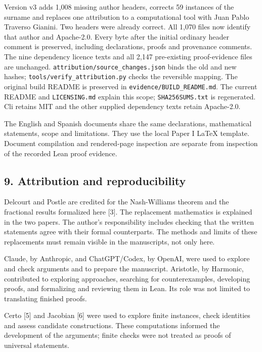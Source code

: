 \documentclass[english,11pt,a4paper]{article}
\begin{document}
Version v3 adds 1,008 missing author headers, corrects 59 instances of the surname and replaces one attribution to a computational tool with Juan Pablo Traverso Gianini. Two headers were already correct. All 1,070 files now identify that author and Apache-2.0. Every byte after the initial ordinary header comment is preserved, including declarations, proofs and provenance comments. The nine dependency licence texts and all 2,147 pre-existing proof-evidence files are unchanged. \texttt{attribution/\allowbreak{}source\_\allowbreak{}changes.\allowbreak{}json} binds the old and new hashes; \texttt{tools/\allowbreak{}verify\_\allowbreak{}attribution.\allowbreak{}py} checks the reversible mapping. The original build README is preserved in \texttt{evidence/\allowbreak{}BUILD\_\allowbreak{}README.\allowbreak{}md}. The current README and \texttt{LICENSING.\allowbreak{}md} explain this scope; \texttt{SHA256SUMS.\allowbreak{}txt} is regenerated. Cli retains MIT and the other supplied dependency texts retain Apache-2.0.

The English and Spanish documents share the same declarations, mathematical statements, scope and limitations. They use the local Paper I LaTeX template. Document compilation and rendered-page inspection are separate from inspection of the recorded Lean proof evidence.

\subsection{9. Attribution and reproducibility}\label{attribution-and-reproducibility}

Delcourt and Postle are credited for the Nash-Williams theorem and the fractional results formalized here {[}3{]}. The replacement mathematics is explained in the two papers. The author's responsibility includes checking that the written statements agree with their formal counterparts. The methods and limits of these replacements must remain visible in the manuscripts, not only here.

Claude, by Anthropic, and ChatGPT/Codex, by OpenAI, were used to explore and check arguments and to prepare the manuscript. Aristotle, by Harmonic, contributed to exploring approaches, searching for counterexamples, developing proofs, and formalizing and reviewing them in Lean. Its role was not limited to translating finished proofs.

Certo {[}5{]} and Jacobian {[}6{]} were used to explore finite instances, check identities and assess candidate constructions. These computations informed the development of the arguments; finite checks were not treated as proofs of universal statements.
\end{document}
